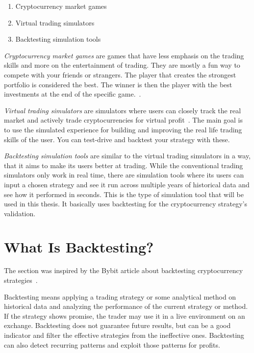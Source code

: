 \begin{enumerate}
    \item Cryptocurrency market games
    \item Virtual trading simulators
    \item Backtesting simulation tools
\end{enumerate}

\emph{Cryptocurrency market games} are games that have less emphasis on the trading skills and more on the entertainment of trading. They are mostly a fun way to compete with your friends or strangers. The player that creates the strongest portfolio is considered the best. The winner is then the player with the best investments at the end of the specific game.~\cite{top-stocks-crypto-trading-simulators}.

\emph{Virtual trading simulators} are simulators where users can closely track the real market and actively trade cryptocurrencies for virtual profit~\cite{top-stocks-crypto-trading-simulators}. The main goal is to use the simulated experience for building and improving the real life trading skills of the user. You can test-drive and backtest your strategy with these.

\emph{Backtesting simulation tools} are similar to the virtual trading simulators in a way, that it aims to make its users better at trading. While the conventional trading simulators only work in real time, there are simulation tools where its users can input a chosen strategy and see it run across multiple years of historical data and see how it performed in seconds. This is the type of simulation tool that will be used in this thesis. It basically uses backtesting for the cryptocurrency strategy's validation.

\section{What Is Backtesting?}
The section was inspired by the Bybit article about backtesting cryptocurrency strategies~\cite{backtesting-crypto-trading-strategies}.

Backtesting means applying a trading strategy or some analytical method on historical data and analyzing the performance of the current strategy or method. If the strategy shows promise, the trader may use it in a live environment on an exchange. Backtesting does not guarantee future results, but can be a good indicator and filter the effective strategies from the ineffective ones. Backtesting can also detect recurring patterns and exploit those patterns for profits.

